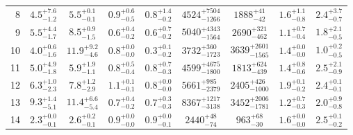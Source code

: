 \begin{table}[ph]
\begin{threeparttable}
\begin{tabular}{r|cccc|cccc}
8 & $ 4.5^{+ 7.6}_{- 1.2}$ & $ 5.5^{+ 0.1}_{- 0.1}$ & $ 0.9^{+ 0.6}_{- 0.5}$ & $ 0.8^{+ 1.4}_{- 0.2}$ & $ 4524^{+ 7504}_{- 1266}$ & $ 1888^{+   41}_{-   42}$ & $  1.6^{+  1.1}_{-  0.8}$ & $  2.4^{+  3.7}_{-  0.7}$\\
9 & $ 5.5^{+ 4.4}_{- 1.7}$ & $ 8.5^{+ 0.9}_{- 1.5}$ & $ 0.6^{+ 0.4}_{- 0.2}$ & $ 0.6^{+ 0.7}_{- 0.2}$ & $ 5040^{+ 4343}_{- 1564}$ & $ 2690^{+  321}_{-  462}$ & $  1.1^{+  0.7}_{-  0.4}$ & $  1.8^{+  2.1}_{-  0.5}$\\
10 & $ 4.0^{+ 0.6}_{- 1.6}$ & $11.9^{+ 9.2}_{- 4.6}$ & $ 0.8^{+ 0.0}_{- 0.0}$ & $ 0.3^{+ 0.1}_{- 0.2}$ & $ 3732^{+  360}_{- 1723}$ & $ 3639^{+ 2601}_{- 1565}$ & $  1.4^{+  0.0}_{-  0.0}$ & $  1.0^{+  0.2}_{-  0.5}$\\
11 & $ 5.0^{+ 4.9}_{- 1.8}$ & $ 5.9^{+ 1.9}_{- 1.1}$ & $ 0.8^{+ 0.5}_{- 0.4}$ & $ 0.8^{+ 0.7}_{- 0.3}$ & $ 4599^{+ 4675}_{- 1800}$ & $ 1813^{+  624}_{-  439}$ & $  1.4^{+  0.8}_{-  0.6}$ & $  2.5^{+  2.1}_{-  0.9}$\\
12 & $ 6.3^{+ 1.0}_{- 2.3}$ & $ 7.8^{+ 1.2}_{- 2.9}$ & $ 1.1^{+ 0.1}_{- 0.1}$ & $ 0.8^{+ 0.0}_{- 0.0}$ & $ 5661^{+  985}_{- 2379}$ & $ 2405^{+  426}_{- 1000}$ & $  1.9^{+  0.1}_{-  0.2}$ & $  2.4^{+  0.1}_{-  0.1}$\\
13 & $ 9.3^{+ 1.4}_{- 5.1}$ & $11.4^{+ 6.6}_{- 5.4}$ & $ 0.7^{+ 0.4}_{- 0.2}$ & $ 0.7^{+ 0.3}_{- 0.3}$ & $ 8367^{+ 1217}_{- 3138}$ & $ 3452^{+ 2006}_{- 1781}$ & $  1.2^{+  0.7}_{-  0.3}$ & $  2.0^{+  0.9}_{-  0.8}$\\
14 & $ 2.3^{+ 0.0}_{- 0.1}$ & $ 2.6^{+ 0.2}_{- 0.1}$ & $ 0.9^{+ 0.0}_{- 0.0}$ & $ 0.9^{+ 0.0}_{- 0.1}$ & $ 2440^{+   48}_{-   74}$ & $  963^{+   68}_{-   30}$ & $  1.6^{+  0.0}_{-  0.0}$ & $  2.5^{+  0.1}_{-  0.2}$\\
            \bottomrule
        \end{tabular}
    \end{threeparttable}
\end{table}



